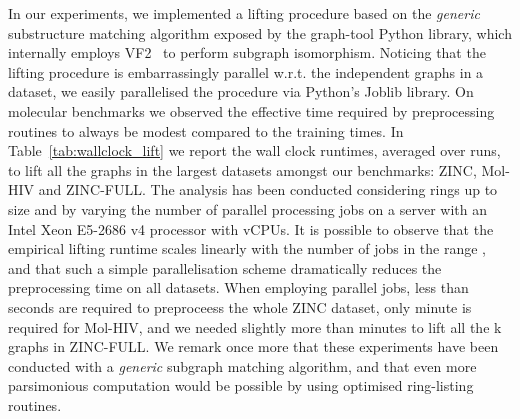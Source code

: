 \documentclass{article}
\begin{document}
\begin{table}[h!]
    \centering
    \caption{Wall-clock lifting times, mean and std over  runs (seconds).}
    \label{tab:wallclock_lift}
    \vspace{1mm}
\end{table}

In our experiments, we implemented a lifting procedure based on the \emph{generic} substructure matching algorithm exposed by the graph-tool Python library, which internally employs VF2~\citep{cordella2004asub} to perform subgraph isomorphism. Noticing that the lifting procedure is embarrassingly parallel w.r.t. the independent graphs in a dataset, we easily parallelised the procedure via Python's Joblib library. On molecular benchmarks we observed the effective time required by preprocessing routines to always be modest compared to the training times. In Table~\ref{tab:wallclock_lift} we report the wall clock runtimes, averaged over  runs, to lift all the graphs in the largest datasets amongst our benchmarks: ZINC, Mol-HIV and ZINC-FULL. The analysis has been conducted considering rings up to size  and by varying the number of parallel processing jobs on a server with an Intel\textsuperscript{\textregistered} Xeon E5-2686 v4 processor with  vCPUs. It is possible to observe that the empirical lifting runtime scales linearly with the number of jobs in the range , and that such a simple parallelisation scheme dramatically reduces the preprocessing time on all datasets. When employing  parallel jobs, less than  seconds are required to preproceess the whole ZINC dataset, only  minute is required for Mol-HIV, and we needed slightly more than  minutes to lift all the k graphs in ZINC-FULL. We remark once more that these experiments have been conducted with a \emph{generic} subgraph matching algorithm, and that even more parsimonious computation would be possible by using optimised ring-listing routines.
\end{document}
